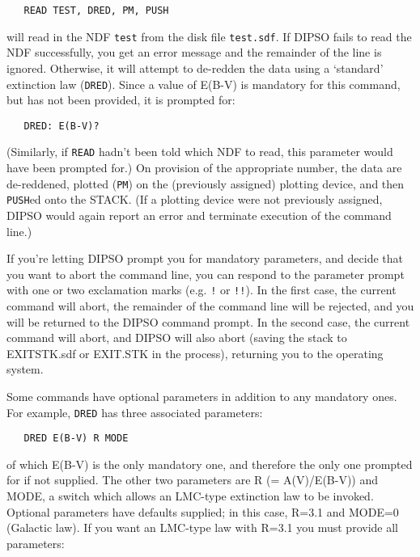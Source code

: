 \documentclass[twoside,11pt]{article}
\newcommand{\htmlref}[2]{#1}
\renewcommand{\_}{\texttt{\symbol{95}}}
\begin{document}
\begin{verbatim}
   READ TEST, DRED, PM, PUSH
\end{verbatim}

will read in the NDF {\tt{test}}  from the disk file {\tt{test.sdf}}.  If DIPSO
fails to read the NDF successfully, you get an error message and the remainder
of the line is ignored. Otherwise, it will attempt to de-redden the data using a
`standard' extinction law (\htmlref{{\tt{DRED}}}{COM:DRED}).  Since a value of E(B-V) is mandatory for
this command, but has not been provided, it is prompted for:

\begin{verbatim}
   DRED: E(B-V)?
\end{verbatim}

(Similarly, if \htmlref{{\tt{READ}}}{COM:READ}  hadn't been told which NDF to read, this
parameter would have been prompted for.) On provision of the
appropriate number, the data are de-reddened, plotted (\htmlref{{\tt{PM}}}{COM:PM})  on the
(previously assigned) plotting device, and then \htmlref{{\tt
PUSH}}{COM:PUSH}ed onto the STACK.
(If a plotting device were not previously assigned, DIPSO would again
report an error and terminate execution of the command line.)

If you're letting DIPSO prompt you for mandatory parameters, and decide
that you want to abort the command line, you can respond to the parameter
prompt with one or two exclamation marks (e.g. {\tt{!}}  or {\tt{!!}}).  In the
first case, the current command will abort, the remainder of the command
line will be rejected, and you will be returned to the DIPSO command
prompt. In the second case, the current command will abort, and DIPSO
will also abort (saving the stack to EXIT\_STK.sdf or EXIT.STK in the
process), returning you to the operating system.

Some commands have optional parameters in addition to any mandatory
ones. For example, \htmlref{{\tt{DRED}}}{COM:DRED}  has three associated parameters:

\begin{verbatim}
   DRED E(B-V) R MODE
\end{verbatim}

of which E(B-V) is the only mandatory one, and therefore the only one
prompted for if not supplied. The other two parameters are R (=
A(V)/E(B-V)) and MODE, a switch which allows an LMC-type extinction
law to be invoked. Optional parameters have defaults supplied; in this
case, R=3.1 and MODE=0 (Galactic law). If you want an LMC-type law
with R=3.1 you must provide all parameters:
\end{document}
